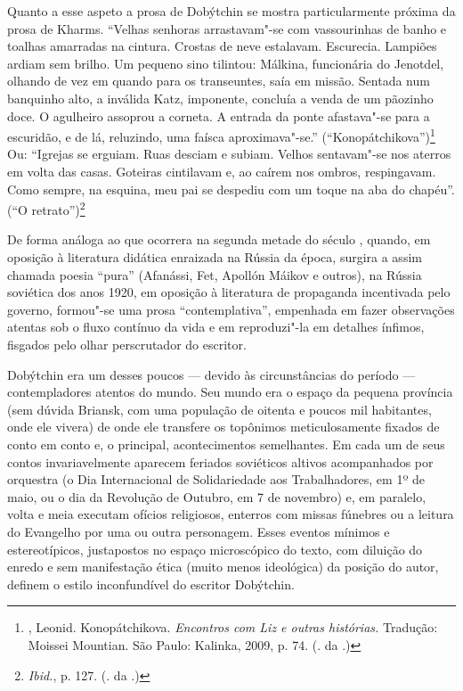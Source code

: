 Quanto a esse aspeto a prosa de Dobýtchin se mostra particularmente
próxima da prosa de Kharms. ``Velhas senhoras arrastavam"-se com
vassourinhas de banho e toalhas amarradas na cintura. Crostas de neve
estalavam. Escurecia. Lampiões ardiam sem brilho. Um pequeno sino
tilintou: Málkina, funcionária do Jenotdel, olhando de vez em quando
para os transeuntes, saía em missão. Sentada num banquinho alto, a
inválida Katz, imponente, concluía a venda de um pãozinho doce. O
agulheiro assoprou a corneta. A entrada da ponte afastava"-se para a
escuridão, e de lá, reluzindo, uma faísca aproximava"-se.''
(``Konopátchikova'')\footnote{\scalebox{.8}{DOBÝTCHIN}, Leonid. Konopátchikova.
  \emph{Encontros com Liz e outras histórias.} Tradução: Moissei
  Mountian. São Paulo: Kalinka, 2009, p. 74. (\scalebox{.8}{N}. da \scalebox{.8}{E}.)} Ou: ``Igrejas
se erguiam. Ruas desciam e subiam. Velhos sentavam"-se nos aterros em
volta das casas. Goteiras cintilavam e, ao caírem nos ombros,
respingavam. Como sempre, na esquina, meu pai se despediu com um toque
na aba do chapéu''. (``O retrato'')\footnote{\emph{Ibid.}, p. 127. (\scalebox{.8}{N}.
  da \scalebox{.8}{E}.)}

De forma análoga ao que ocorrera na segunda metade do século \scalebox{.8}{XIX},
quando, em oposição à literatura didática enraizada na Rússia da época,
surgira a assim chamada poesia ``pura'' (Afanássi, Fet, Apollón Máikov e
outros), na Rússia soviética dos anos 1920, em oposição à literatura de
propaganda incentivada pelo governo, formou"-se uma prosa
``contemplativa'', empenhada em fazer observações atentas sob o fluxo
contínuo da vida e em reproduzi"-la em detalhes ínfimos, fisgados pelo
olhar perscrutador do escritor.

Dobýtchin era um desses poucos --- devido às circunstâncias do período
--- contempladores atentos do mundo. Seu mundo era o espaço da pequena
província (sem dúvida Briansk, com uma população de oitenta e poucos mil
habitantes, onde ele vivera) de onde ele transfere os topônimos
meticulosamente fixados de conto em conto e, o principal, acontecimentos
semelhantes. Em cada um de seus contos invariavelmente aparecem feriados
soviéticos altivos acompanhados por orquestra (o Dia Internacional de
Solidariedade aos Trabalhadores, em 1º de maio, ou o dia da Revolução de
Outubro, em 7 de novembro) e, em paralelo, volta e meia executam ofícios
religiosos, enterros com missas fúnebres ou a leitura do Evangelho por
uma ou outra personagem. Esses eventos mínimos e estereotípicos,
justapostos no espaço microscópico do texto, com diluição do enredo e
sem manifestação ética (muito menos ideológica) da posição do autor,
definem o estilo inconfundível do escritor Dobýtchin.

